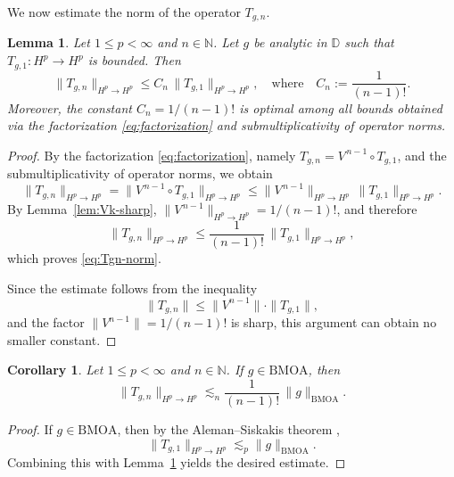 \documentclass[preprint,12pt]{elsarticle}
\numberwithin{equation}{section}
\newtheorem{corollary}{Corollary}[section]
\newtheorem{lemma}{Lemma}[section]
\theoremstyle{remark}
\begin{document}
We now estimate the norm of the operator $T_{g,n}$.

\begin{lemma}\label{lem:norm-est}
Let $1\le p<\infty$ and $n\in\mathbb{N}$. Let $g$ be analytic in $\mathbb{D}$ such that $T_{g,1}:H^p\to H^p$ is bounded.
Then
\begin{equation}\label{eq:Tgn-norm}
\|T_{g,n}\|_{H^p\to H^p}
\le C_n\,\|T_{g,1}\|_{H^p\to H^p},
\quad\text{where}\quad
C_n:=\frac{1}{(n-1)!}.
\end{equation}
Moreover, the constant $C_n=1/(n-1)!$ is optimal among all bounds obtained via the factorization \eqref{eq:factorization} and submultiplicativity of operator norms.
\end{lemma}

\begin{proof}
By the factorization \eqref{eq:factorization}, namely $T_{g,n}=V^{\,n-1}\circ T_{g,1}$,
and the submultiplicativity of operator norms, we obtain
\begin{equation*}
\|T_{g,n}\|_{H^p\to H^p}
=\|V^{\,n-1}\circ T_{g,1}\|_{H^p\to H^p}
\le \|V^{\,n-1}\|_{H^p\to H^p}\,\|T_{g,1}\|_{H^p\to H^p}.
\end{equation*}
By Lemma~\ref{lem:Vk-sharp}, $\|V^{\,n-1}\|_{H^p\to H^p}=1/(n-1)!$, and therefore
\begin{equation*}
\|T_{g,n}\|_{H^p\to H^p}
\le \frac{1}{(n-1)!}\,\|T_{g,1}\|_{H^p\to H^p},
\end{equation*}
which proves \eqref{eq:Tgn-norm}.

Since the estimate follows from the inequality
\begin{equation*}
\|T_{g,n}\|\le \|V^{n-1}\|\cdot\|T_{g,1}\|,
\end{equation*}
and the factor $\|V^{n-1}\|=1/(n-1)!$ is sharp, this argument can obtain no smaller constant.
\end{proof}

\begin{corollary}\label{cor:BMOA-norm}
Let $1\le p<\infty$ and $n\in\mathbb{N}$. If $g\in\mathrm{BMOA}$, then
\begin{equation*}
\|T_{g,n}\|_{H^p\to H^p}
\lesssim_{n}
\frac{1}{(n-1)!}\,\|g\|_{\mathrm{BMOA}}.
\end{equation*}
\end{corollary}

\begin{proof}
If $g\in\mathrm{BMOA}$, then by the Aleman--Siskakis theorem \cite{Aleman},
\begin{equation*}
\|T_{g,1}\|_{H^p\to H^p}\lesssim_p \|g\|_{\mathrm{BMOA}}.
\end{equation*}
Combining this with Lemma~\ref{lem:norm-est} yields the desired estimate.
\end{proof}
\end{document}
